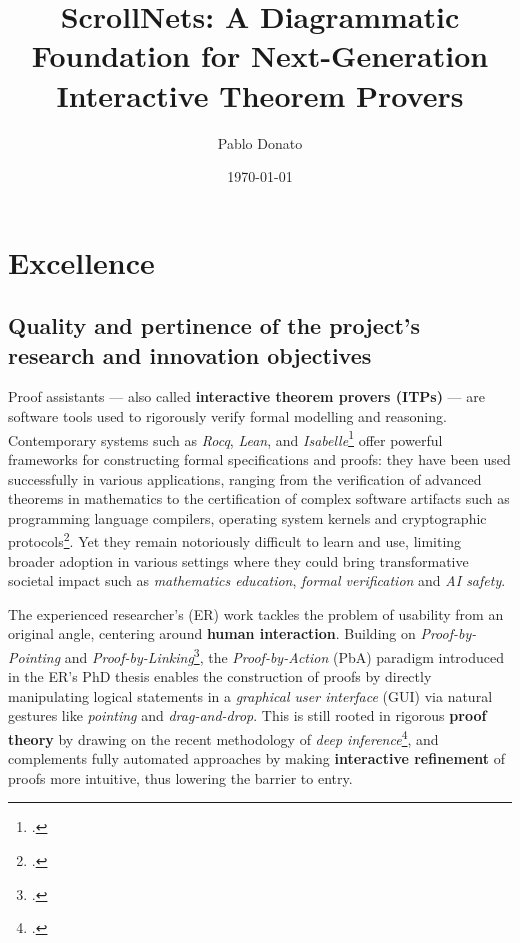 \documentclass[11pt]{msca-pf}
\title{ScrollNets: A Diagrammatic Foundation for Next-Generation Interactive Theorem Provers}
\author{Pablo Donato}
\date{\today}
\begin{document}
\maketitle



\section{Excellence }
\label{sc:excellence}

\subsection{Quality and pertinence of the project's research and innovation objectives}
\label{ssc:excellence:quality}

Proof assistants --- also called \textbf{interactive theorem provers (ITPs)} --- are software tools
used to rigorously verify formal modelling and reasoning. Contemporary systems such as \emph{Rocq},
\emph{Lean}, and
\emph{Isabelle}\footcite{the_rocq_development_team_2025_15149629,10.1007/978-3-030-79876-5_37,nipkow2002isabelle}
offer powerful frameworks for constructing formal specifications and proofs: they have been used
successfully in various applications, ranging from the verification of advanced theorems in
mathematics to the certification of complex software artifacts such as programming language
compilers, operating system kernels and cryptographic
protocols\footcite{gonthierFormalProofFour2008,leroyFormalVerificationRealistic2009,kleinSeL4FormalVerification2009,Barthe2014}.
Yet they remain notoriously difficult to learn and use, limiting broader adoption in various
settings where they could bring transformative societal impact such as \emph{mathematics education},
\emph{formal verification} and \emph{AI safety}.

The experienced researcher's (ER) work tackles the problem of usability from an original angle,
centering around \textbf{human interaction}. Building on \emph{Proof-by-Pointing} and
\emph{Proof-by-Linking}\footcite{PbP,Chaudhuri2013}, the \emph{Proof-by-Action} (PbA) paradigm
introduced in the ER's PhD thesis enables the construction of proofs by directly manipulating
logical statements in a \emph{graphical user interface} (GUI) via natural gestures like
\emph{pointing} and \emph{drag-and-drop}. This is still rooted in rigorous \textbf{proof theory} by
drawing on the recent methodology of \emph{deep inference}\footcite{deep_inference}, and complements
fully automated approaches by making \textbf{interactive refinement} of proofs more intuitive, thus
lowering the barrier to entry.
\end{document}
